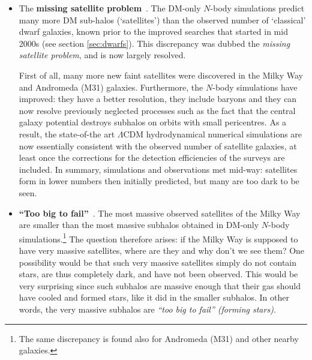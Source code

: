 \begin{itemize}
\item[$\blacktriangleright$]
The {\bf missing satellite problem}~\cite{missingsatellite}. The DM-only $N$-body simulations predict many more DM sub-halos (`satellites') than the observed number of  `classical' dwarf galaxies, known prior to the improved searches that started in mid 2000s (see section \ref{sec:dwarfs}). This discrepancy was dubbed the {\em missing satellite problem}, and is now largely resolved. 

First of all, many more new faint satellites were discovered in the Milky Way and Andromeda (M31) galaxies. Furthermore, the $N$-body simulations have improved: they have a better resolution, they include baryons and they can now resolve previously neglected processes such as the fact that the central galaxy potential destroys subhalos on orbits with small pericentres. As a result, the state-of-the art $\Lambda$CDM hydrodynamical numerical simulations are now essentially consistent with the observed number of satellite galaxies, at least once the corrections for the detection efficiencies of the surveys are included. In summary, simulations and observations met mid-way: satellites form in lower numbers then initially predicted, but many are too dark to be seen.


\item[$\blacktriangleright$] 
{\bf ``Too big to fail''}~\cite{toobigtofail}. The most massive observed satellites of the Milky Way are smaller than the most massive subhalos obtained in DM-only $N$-body simulations.\footnote{The same discrepancy is found also for Andromeda (M31) and other nearby galaxies.} The question therefore arises: if the Milky Way is supposed to have very massive satellites, where are they and why don't we see them? One possibility would be that such very massive satellites simply do not contain stars, are thus completely dark, and have not been observed. This would be very surprising since such subhalos are massive enough that their gas should have cooled and formed stars, like it did in the smaller subhalos. In other words, the very massive subhalos are {\em ``too big to fail'' (forming stars)}. 


\end{itemize}
